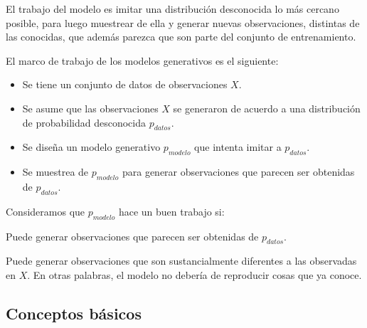 El trabajo del modelo es imitar una distribución desconocida lo más cercano posible, para luego muestrear de ella y generar nuevas observaciones, distintas de las conocidas, que además parezca que son parte del conjunto de entrenamiento.

El marco de trabajo de los modelos generativos es el siguiente:

\begin{itemize}
	\item Se tiene un conjunto de datos de observaciones $X$.
	\item Se asume que las observaciones $X$ se generaron de acuerdo a una distribución de probabilidad desconocida $p_{datos}$.
 	\item Se diseña un modelo generativo $p_{modelo}$ que intenta imitar a $p_{datos}$.
	\item Se muestrea de $p_{modelo}$ para generar observaciones que parecen ser obtenidas de $p_{datos}$.
\end{itemize}

Consideramos que $p_{modelo}$ hace un buen trabajo si:

Puede generar observaciones que parecen ser obtenidas de $p_{datos}$.

Puede generar observaciones que son sustancialmente diferentes a las observadas en $X$. En otras palabras, el modelo no debería de reproducir cosas que ya conoce.

\subsection{Conceptos básicos}




